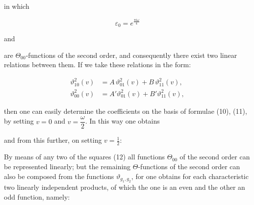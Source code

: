 
in which

\[
\varepsilon_0 = e^{\frac{\pi i \omega}{4}}
\]

and




are $\Theta_{00}$-functions of the second order, and consequently there
exist two linear relations between them. If we take these relations
 in the form:

\[
\begin{aligned}
\vartheta_{10}^2(v) &= A\,\vartheta_{01}^2(v) + B\,\vartheta_{11}^2(v),\\
\vartheta_{00}^2(v) &= A'\vartheta_{01}^2(v) + B'\vartheta_{11}^2(v),
\end{aligned}
\]

then one can easily determine the coefficients on the basis of formulae (10), (11),
by setting $v = 0$ and $v = \dfrac{\omega}{2}$. In this way one
obtains


and from this further, on setting $v = \tfrac{1}{2}$:


By means of any two of the squares (12) all functions $\Theta_{00}$ of
the second order can be represented linearly; but the remaining
$\Theta$-functions of the second order can also be composed from the
functions $\vartheta_{g_1,g_2}$, for one obtains for each
characteristic two linearly independent products, of which the one is
an even and the other an odd function, namely:


